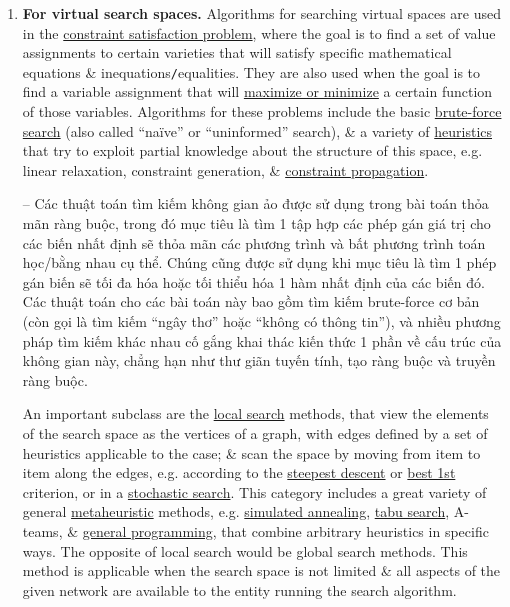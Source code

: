 \documentclass{article}
\begin{document}
\begin{enumerate}
	\item {\bf For virtual search spaces.} Algorithms for searching virtual spaces are used in the \href{https://en.wikipedia.org/wiki/Constraint_satisfaction_problem}{constraint satisfaction problem}, where the goal is to find a set of value assignments to certain varieties that will satisfy specific mathematical equations \& inequations{\tt/}equalities. They are also used when the goal is to find a variable assignment that will \href{https://en.wikipedia.org/wiki/Discrete_optimization}{maximize or minimize} a certain function of those variables. Algorithms for these problems include the basic \href{https://en.wikipedia.org/wiki/Brute-force_search}{brute-force search} (also called ``na\"ive'' or ``uninformed'' search), \& a variety of \href{https://en.wikipedia.org/wiki/Heuristic_function}{heuristics} that try to exploit partial knowledge about the structure of this space, e.g. linear relaxation, constraint generation, \& \href{https://en.wikipedia.org/wiki/Local_consistency}{constraint propagation}.
	
	-- Các thuật toán tìm kiếm không gian ảo được sử dụng trong bài toán thỏa mãn ràng buộc, trong đó mục tiêu là tìm 1 tập hợp các phép gán giá trị cho các biến nhất định sẽ thỏa mãn các phương trình và bất phương trình toán học/bằng nhau cụ thể. Chúng cũng được sử dụng khi mục tiêu là tìm 1 phép gán biến sẽ tối đa hóa hoặc tối thiểu hóa 1 hàm nhất định của các biến đó. Các thuật toán cho các bài toán này bao gồm tìm kiếm brute-force cơ bản (còn gọi là tìm kiếm ``ngây thơ'' hoặc ``không có thông tin''), và nhiều phương pháp tìm kiếm khác nhau cố gắng khai thác kiến thức 1 phần về cấu trúc của không gian này, chẳng hạn như thư giãn tuyến tính, tạo ràng buộc và truyền ràng buộc.
	
	An important subclass are the \href{https://en.wikipedia.org/wiki/Local_search_(optimization)}{local search} methods, that view the elements of the search space as the vertices of a graph, with edges defined by a set of heuristics applicable to the case; \& scan the space by moving from item to item along the edges, e.g. according to the \href{https://en.wikipedia.org/wiki/Gradient_descent}{steepest descent} or \href{https://en.wikipedia.org/wiki/Best-first_search}{best 1st} criterion, or in a \href{https://en.wikipedia.org/wiki/Stochastic_optimization}{stochastic search}. This category includes a great variety of general \href{https://en.wikipedia.org/wiki/Metaheuristic}{metaheuristic} methods, e.g. \href{https://en.wikipedia.org/wiki/Simulated_annealing}{simulated annealing}, \href{https://en.wikipedia.org/wiki/Tabu_search}{tabu search}, A-teams, \& \href{https://en.wikipedia.org/wiki/Genetic_programming}{general programming}, that combine arbitrary heuristics in specific ways. The opposite of local search would be global search methods. This method is applicable when the search space is not limited \& all aspects of the given network are available to the entity running the search algorithm.
	

\end{enumerate}
\end{document}

